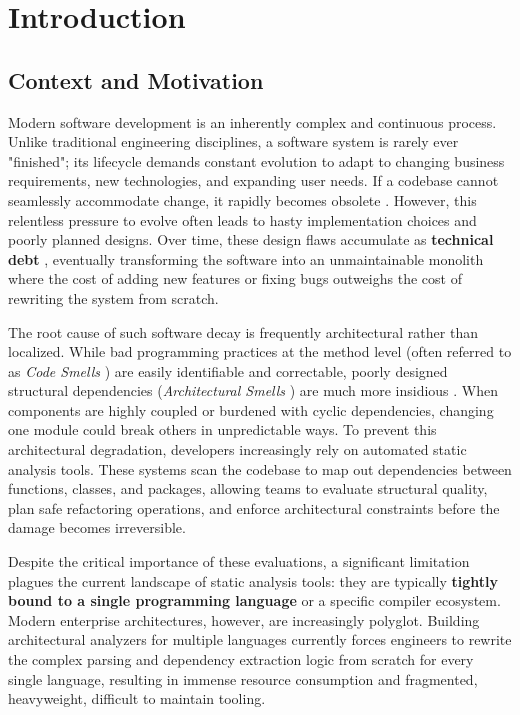 \chapter{Introduction}
\label{ch:introduction}

\section{Context and Motivation}
Modern software development is an inherently complex and continuous
process. Unlike traditional engineering disciplines, a software
system is rarely ever "finished"; its lifecycle demands constant
evolution to adapt to changing business requirements, new
technologies, and expanding user needs. If a codebase cannot
seamlessly accommodate change, it rapidly becomes obsolete
\cite{lehman_programs_1980}. However,
this relentless pressure to evolve often leads to hasty
implementation choices and poorly planned designs. Over time, these
design flaws accumulate as \textbf{technical debt}
\cite{cunningham_wycash_1992},\cite{kruchten_technical_2012}
eventually transforming the
software into an unmaintainable monolith where the cost of adding
new features or fixing bugs outweighs the cost of rewriting the
system from scratch.

The root cause of such software decay is frequently architectural
rather than localized. While bad programming practices at the method
level (often referred to as \textit{Code Smells}
\cite{fowler_refactoring_2013, arcelli_fontana_automatic_2012}) are
easily identifiable and
correctable, poorly designed structural dependencies
(\textit{Architectural Smells}
\cite{garcia_identifying_2009}) are much more insidious
\cite{fontana_arcan_2017}.
When components are highly coupled or burdened with cyclic
dependencies, changing one module could break others in
unpredictable ways. To prevent this architectural degradation,
developers increasingly rely on automated static analysis tools.
These systems scan the codebase to map out dependencies between
functions, classes, and packages, allowing teams to evaluate
structural quality, plan safe refactoring operations, and enforce
architectural constraints before the damage becomes irreversible.

Despite the critical importance of these evaluations, a significant
limitation plagues the current landscape of static analysis tools:
they are typically \textbf{tightly bound to a single programming language} or
a specific compiler ecosystem. Modern enterprise architectures,
however, are increasingly polyglot.
Building architectural analyzers for multiple languages currently
forces engineers to rewrite the complex parsing and dependency
extraction logic from scratch for every single language, resulting in
immense resource consumption and fragmented, heavyweight, difficult
to maintain tooling.

